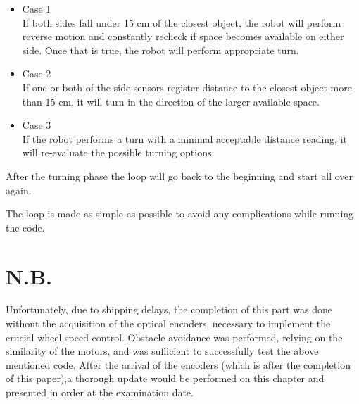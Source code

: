 \begin{itemize}

\item Case 1 \\ If both sides fall under 15 cm of the closest object, the robot will perform reverse motion and constantly recheck if space becomes available on either side. Once that is true, the robot will perform appropriate turn. 
\item Case 2 \\ If one or both of the side sensors register distance to the closest object more than 15 cm, it will turn in the direction of the larger available space.
\item Case 3 \\ If the robot performs a turn with a minimal acceptable distance reading, it will re-evaluate the possible turning options.

\end{itemize}

After the turning phase the loop will go back to the beginning and start all over again.

The loop is made as simple as possible to avoid any complications while running the code.

\section{N.B.}

Unfortunately, due to shipping delays, the completion of this part was done without the acquisition of the optical encoders, necessary to implement the crucial wheel speed control. Obstacle avoidance was performed, relying on the similarity of the motors, and was sufficient to successfully test the above mentioned code. After the arrival of the encoders (which is after the completion of this paper),a thorough update would be performed on this chapter and presented in order at the examination date. 